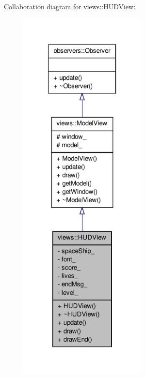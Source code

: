 \-Collaboration diagram for views\-:\-:\-H\-U\-D\-View\-:\nopagebreak
\begin{figure}[H]
\begin{center}
\leavevmode
\includegraphics[height=550pt]{df/df3/classviews_1_1HUDView__coll__graph}
\end{center}
\end{figure}
